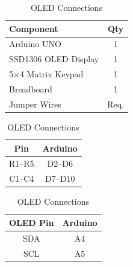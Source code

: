\begin{table}[H]
\centering


\begin{minipage}[t]{0.48\textwidth}
\centering
\caption{Components Used}
\label{tab:bodmas_components}

\begin{tabular}{|p{3.5cm}|c|}
\hline
\textbf{Component} & \textbf{Qty} \\
\hline
Arduino UNO & 1 \\
SSD1306 OLED Display & 1 \\
5×4 Matrix Keypad & 1 \\
Breadboard & 1 \\
Jumper Wires & Req. \\
\hline
\end{tabular}

\end{minipage}
\hfill
\begin{minipage}[t]{0.48\textwidth}
\centering
\caption{Keypad Connections}
\label{tab:bodmas_keypad}

\begin{tabular}{|c|c|}
\hline
\textbf{Pin} & \textbf{Arduino} \\
\hline
R1--R5 & D2--D6 \\
C1--C4 & D7--D10 \\
\hline
\end{tabular}

\end{minipage}

\vspace{0.6cm}



\begin{minipage}[t]{0.48\textwidth}
\centering
\caption{OLED Connections}
\label{tab:bodmas_oled}

\begin{tabular}{|c|c|}
\hline
\textbf{OLED Pin} & \textbf{Arduino} \\
\hline
SDA & A4 \\
SCL & A5 \\
\hline
\end{tabular}


\end{minipage}
\end{table}
